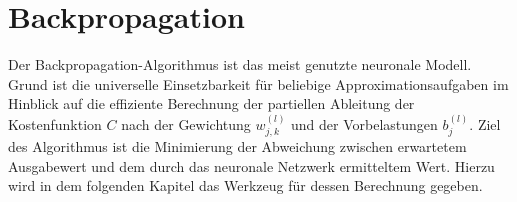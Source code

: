 \section{Backpropagation}
\label{chap:backprop}
Der Backpropagation-Algorithmus ist das meist genutzte neuronale Modell. Grund ist die universelle Einsetzbarkeit für beliebige Approximationsaufgaben im Hinblick auf die effiziente Berechnung der partiellen Ableitung der Kostenfunktion $C$ nach der Gewichtung $w_{j,k}^{(l)}$ und der Vorbelastungen $b_j^{(l)}$. Ziel des Algorithmus ist die Minimierung der Abweichung zwischen erwartetem Ausgabewert und dem durch das neuronale Netzwerk ermitteltem Wert. Hierzu wird in dem folgenden Kapitel das Werkzeug für dessen Berechnung gegeben. \\



